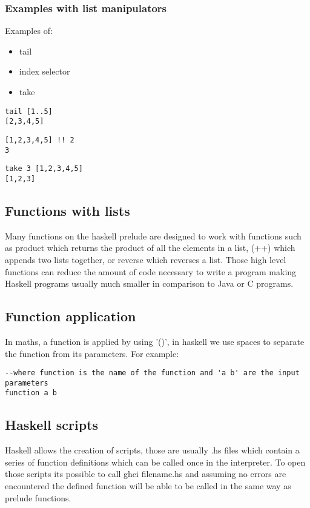 \documentclass[12pt, oneside]{article}
\begin{document}
\subsubsection{Examples with list manipulators}
Examples of:
\begin{itemize}
\item{tail}
\item{index selector}
\item{take}
\end{itemize}
\begin{lstlisting}
tail [1..5]
[2,3,4,5]
\end{lstlisting}
\begin{lstlisting}
[1,2,3,4,5] !! 2
3
\end{lstlisting}
\begin{lstlisting}
take 3 [1,2,3,4,5]
[1,2,3]
\end{lstlisting}
\subsection{Functions with lists}
Many functions on the haskell prelude are designed to work with functions such as product which returns the product of all the elements in a list, (++) which appends two lists together, or reverse which reverses a list.
Those high level functions can reduce the amount of code necessary to write a program making Haskell programs usually much smaller in comparison to Java or C programs.
\subsection{Function application}
In maths, a function is applied by using '()', in haskell we use spaces to separate the function from its parameters. For example:
\begin{lstlisting}
--where function is the name of the function and 'a b' are the input parameters
function a b
\end{lstlisting}
\subsection{Haskell scripts}
Haskell allows the creation of scripts, those are usually .hs files which contain a series of function definitions which can be called once in the interpreter. To open those scripts its possible to call ghci filename.hs and assuming no errors are encountered the defined function will be able to be called in the same way as prelude functions.
\end{document}
